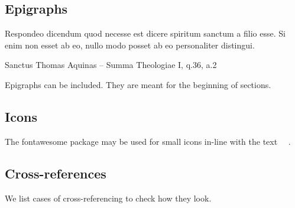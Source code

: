 \subsection{Epigraphs}
\epigraph{Respondeo dicendum quod necesse est dicere spiritum sanctum a filio
esse. Si enim non esset ab eo, nullo modo posset ab eo personaliter distingui.}
{Sanctus Thomas Aquinas -- Summa Theologiae I, q.36, a.2}

Epigraphs can be included. They are meant for the beginning of sections.

\subsection{Icons}
The fontawesome package \cite{fontawesome-latex} may be used for small icons
in-line with the text \faSmileO~\faMedkit~\faBicycle.

\subsection{Cross-references}
We list cases of cross-referencing to check how they look.

